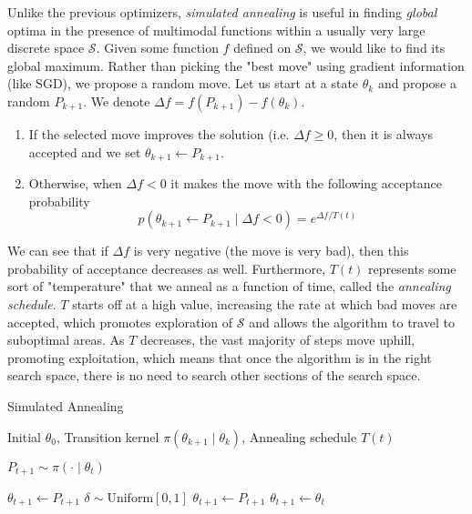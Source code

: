 \documentclass{article}
\begin{document}
    Unlike the previous optimizers, \textit{simulated annealing} is useful in finding \textit{global} optima in the presence of multimodal functions within a usually very large discrete space $\mathcal{S}$. Given some function $f$ defined on $\mathcal{S}$, we would like to find its global maximum. Rather than picking the "best move" using gradient information (like SGD), we propose a random move. Let us start at a state $\theta_k$ and propose a random $P_{k+1}$. We denote $\Delta f = f(P_{k+1}) - f(\theta_k)$. 
    \begin{enumerate}
        \item If the selected move improves the solution (i.e. $\Delta f \geq 0$, then it is always accepted and we set $\theta_{k+1} \gets P_{k+1}$. 
        \item Otherwise, when $\Delta f < 0$ it makes the move with the following acceptance probability 
        \[p(\theta_{k+1} \gets P_{k+1} \mid \Delta f < 0) = e^{\Delta f / T(t)}\]
    \end{enumerate}
    We can see that if $\Delta f$ is very negative (the move is very bad), then this probability of acceptance decreases as well. Furthermore, $T(t)$ represents some sort of "temperature" that we anneal as a function of time, called the \textit{annealing schedule}. $T$ starts off at a high value, increasing the rate at which bad moves are accepted, which promotes exploration of $\mathcal{S}$ and allows the algorithm to travel to suboptimal areas. As $T$ decreases, the vast majority of steps move uphill, promoting exploitation, which means that once the algorithm is in the right search space, there is no need to search other sections of the search space. 

    \begin{algorithm}
    \caption{Simulated Annealing}\label{alg:sim_anneal}
    \begin{algorithmic}

    \Require Initial $\theta_0$, Transition kernel $\pi(\theta_{k+1} \mid \theta_k)$, Annealing schedule $T(t)$

        \State $P_{t+1} \sim \pi( \cdot \mid \theta_t)$
        
            \State $\theta_{t+1} \gets P_{t+1}$ 
        \Else 
            \State $\delta \sim \mathrm{Uniform}[0, 1]$
            \If{$\delta < \exp[(f(P_{t+1}) - f(\theta_t))/T(t)]$}
                \State $\theta_{t+1} \gets P_{t+1}$ 
            \Else 
                \State $\theta_{t+1} \gets \theta_t$ 
            \EndIf
        \EndIf
    \EndFor

    \end{algorithmic}
    \end{algorithm}
\end{document}
